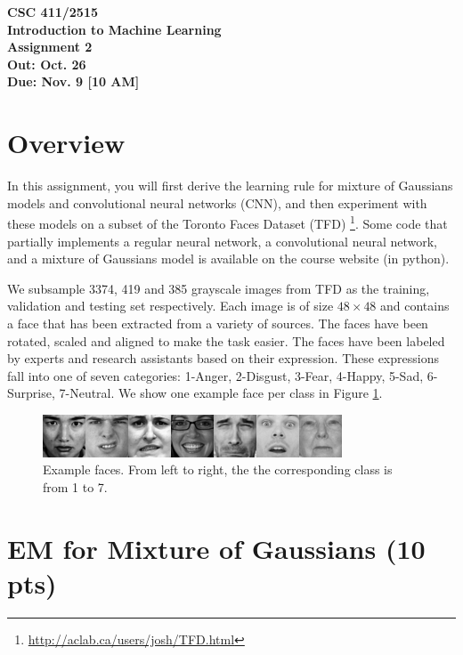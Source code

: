 \documentclass[12pt]{article}
\begin{document}
\begin{center}
{\bf CSC 411/2515}\\
{\bf Introduction to Machine Learning}\\
{\large \bf Assignment 2}\\
{\bf Out:  Oct. 26}\\
{\bf Due:  Nov. 9 [10 AM]}
\end{center}

\section*{Overview}

In this assignment, you will first derive the learning rule for mixture of
Gaussians models and convolutional neural networks (CNN), and then experiment with
these models on a subset of the Toronto Faces Dataset (TFD)
\footnote{\url{http://aclab.ca/users/josh/TFD.html}}. Some code that partially
implements a regular neural network, a  convolutional neural
network, and a mixture of  Gaussians model is available on the course website (in
python).

We subsample 3374, 419 and 385 grayscale images from TFD as the training,
validation and testing set respectively. Each image is of size $48 \times 48$
and contains a face that has been extracted from a variety of sources. The
faces have been rotated, scaled and aligned to make the task easier. The faces
have been labeled by experts and research assistants based on their expression.
These expressions fall into one of seven categories: 1-Anger, 2-Disgust,
3-Fear, 4-Happy, 5-Sad, 6-Surprise, 7-Neutral. We show one example face per
class in Figure \ref{fig_face}.

\begin{figure}[h]
\centering
\includegraphics[width=0.99\linewidth]{example_face.png}
\vspace{-0.1in}
\caption{Example faces. From left to right, the the corresponding class is from 1 to 7.}
\label{fig_face}
\vspace{-0.1in}
\end{figure}


\section{EM for Mixture of Gaussians (10 pts)}
\end{document}
